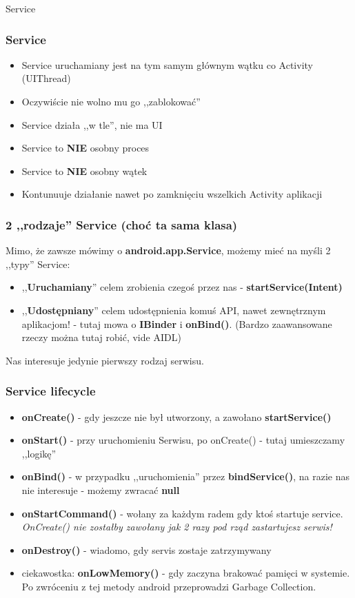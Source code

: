 \begin{frame}
\begin{center}
 \Huge{Service}
\end{center}
\end{frame}

\begin{frame}\frametitle{Service}
\begin{itemize}
 \item Service uruchamiany jest na tym samym głównym wątku co Activity (UIThread)
 \pause \item Oczywiście nie wolno mu go ,,zablokować''
 \pause \item Service działa ,,w tle'', nie ma UI
 \pause \item Service to \textbf{NIE} osobny proces
 \pause \item Service to \textbf{NIE} osobny wątek
 \pause \item Kontunuuje działanie nawet po zamknięciu wszelkich Activity aplikacji
\end{itemize}
\end{frame}

\begin{frame}\frametitle{2 ,,rodzaje'' Service (choć ta sama klasa)}
Mimo, że zawsze mówimy o \textbf{android.app.Service}, możemy mieć na myśli 2 ,,typy'' Service:
\begin{itemize}
 \pause \item ,,\textbf{Uruchamiany}'' celem zrobienia czegoś przez nas - \textbf{startService(Intent)}
 \pause \item ,,\textbf{Udostępniany}'' celem udostępnienia komuś API, nawet zewnętrznym aplikacjom! - tutaj mowa o \textbf{IBinder} i \textbf{onBind()}. (Bardzo zaawansowane rzeczy można tutaj robić, vide AIDL)
\end{itemize}
\pause Nas interesuje jedynie pierwszy rodzaj serwisu.
\end{frame}

\begin{frame}\frametitle{Service lifecycle}
 \begin{itemize}
  \item \textbf{onCreate()} - gdy jeszcze nie był utworzony, a zawołano \textbf{startService()}
  \pause \item \textbf{onStart()} - przy uruchomieniu Serwisu, po onCreate() - tutaj umieszczamy ,,logikę''
  \pause \item \textbf{onBind()} - w przypadku ,,uruchomienia'' przez \textbf{bindService()}, na razie nas nie interesuje - możemy zwracać \textbf{null}
  \pause \item \textbf{onStartCommand()} - wołany za każdym radem gdy ktoś startuje service. \textit{OnCreate() nie zostałby zawołany jak 2 razy pod rząd zastartujesz serwis!}
  \pause \item \textbf{onDestroy()} - wiadomo, gdy servis zostaje zatrzymywany
  \pause \item ciekawostka: \textbf{onLowMemory()} - gdy zaczyna brakować pamięci w systemie. Po zwróceniu z tej metody android przeprowadzi Garbage Collection.
 \end{itemize}
\end{frame}


